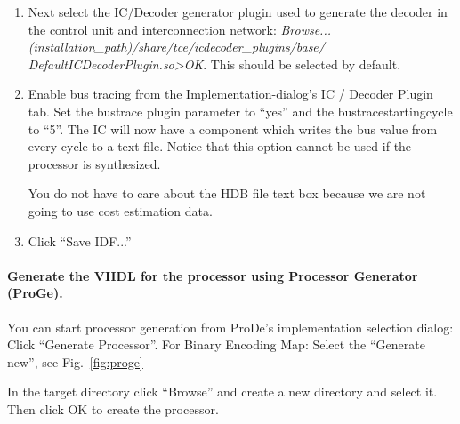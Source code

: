 \documentclass[twoside]{tceusermanual}
\begin{document}
\begin{enumerate}
\begin{enumerate}
\end{enumerate}

\item%
Next select the IC/Decoder generator plugin used to generate the
decoder in the control unit and interconnection network:
\textit{Browse... (installation\_path)/share/tce/icdecoder\_plugins/base/
DefaultICDecoderPlugin.so>OK}. This should be selected by default.

\item%
Enable bus tracing from the Implementation-dialog's IC / Decoder Plugin tab.
Set the bustrace plugin parameter to ``yes'' and the bustracestartingcycle to
``5''. The IC will now have a component which writes the bus value from every
cycle to a text file. Notice that this option cannot be used if the processor
is synthesized.

You do not have to care about the HDB file text box because we are not going 
to use cost estimation data.

\item%
Click ``Save IDF...''
\end{enumerate}



%
%
%


\paragraph{Generate the VHDL for the processor using Processor Generator
(ProGe).}

You can start processor generation from ProDe's implementation selection dialog:
Click ``Generate Processor''. For Binary Encoding Map: Select the
``Generate new'', see Fig.~\ref{fig:proge} 

In the target directory click ``Browse'' and create a new
directory  and select it. Then click OK to create the
processor.
\end{document}
